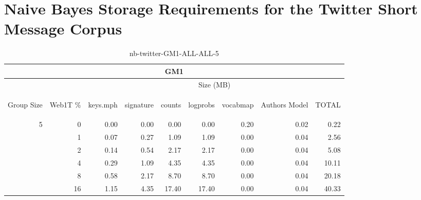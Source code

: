 \chapter{Naive Bayes Storage Requirements for the Twitter Short Message Corpus}

\begin{center}
\begin{table}[htbp] 
 \begin{center}
\begin{tabular}{ | r | r | r | r | r | r | r | r | r |}
\hline
\multicolumn{9}{|c|}{GM1}\\
\hline
 & & \multicolumn{7}{|c|}{Size (MB)}\\ \cline{3-9}
\begin{sideways}Group Size\end{sideways} & \begin{sideways}Web1T \% \end{sideways} & \begin{sideways}keys.mph\end{sideways} & \begin{sideways}signature\end{sideways} & \begin{sideways}counts\end{sideways} & \begin{sideways}logprobs\end{sideways} & \begin{sideways}vocabmap\end{sideways} & \begin{sideways}Authors Model \end{sideways} & \begin{sideways}TOTAL\end{sideways}\\
\hline
\multirow{5}{*}{5}
 & 0 & 0.00 & 0.00 & 0.00 & 0.00 & 0.20 & 0.02 & 0.22\\ \cline{2-9}
 & 1 & 0.07 & 0.27 & 1.09 & 1.09 & 0.00 & 0.04 & 2.56\\ \cline{2-9}
 & 2 & 0.14 & 0.54 & 2.17 & 2.17 & 0.00 & 0.04 & 5.08\\ \cline{2-9}
 & 4 & 0.29 & 1.09 & 4.35 & 4.35 & 0.00 & 0.04 & 10.11\\ \cline{2-9}
 & 8 & 0.58 & 2.17 & 8.70 & 8.70 & 0.00 & 0.04 & 20.18\\ \cline{2-9}
 & 16 & 1.15 & 4.35 & 17.40 & 17.40 & 0.00 & 0.04 & 40.33\\ \cline{2-9}
\hline
\end{tabular}
\caption{nb-twitter-GM1-ALL-ALL-5}
\label{table:nb-twitter-GM1-ALL-ALL-5}
\end{center}
 \end{table}
\end{center}

